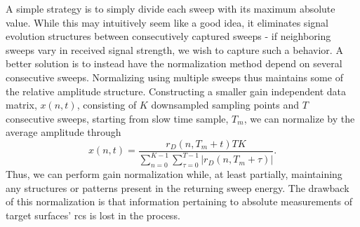 A simple strategy is to simply divide each sweep with its maximum absolute value. While this may intuitively seem like a good idea, it eliminates signal evolution structures between consecutively captured sweeps - if neighboring sweeps vary in received signal strength, we wish to capture such a behavior. A better solution is to instead have the normalization method depend on several consecutive sweeps. Normalizing using multiple sweeps thus maintains some of the relative amplitude structure. Constructing a smaller gain independent data matrix, $x(n,t)$, consisting of $K$ downsampled sampling points and $T$ consecutive sweeps, starting from slow time sample, $T_m$, we can normalize by the average amplitude through
\begin{equation}
	x(n,t) = 
	\frac{r_D(n, T_m + t)TK}{\sum_{n=0}^{K-1}\sum_{\tau=0}^{T-1}|r_D(n, T_m+\tau)|}.
\end{equation}
\noindent
Thus, we can perform gain normalization while, at least partially, maintaining any structures or patterns present in the returning sweep energy. The drawback of this normalization is that information pertaining to absolute measurements of target surfaces' \gls{rcs} is lost in the process.

